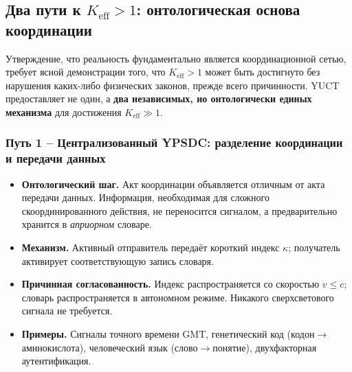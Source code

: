 \documentclass[11pt,a4paper]{article}
\begin{document}
	\subsection{Два пути к \(K_{\mathrm{eff}} > 1\): онтологическая основа координации}
	\label{subsec:two-paths-ontology}
	
	Утверждение, что реальность фундаментально является координационной сетью, требует
	ясной демонстрации того, что \(K_{\mathrm{eff}} > 1\) может быть достигнуто без
	нарушения каких-либо физических законов, прежде всего причинности. YUCT предоставляет не
	один, а \textbf{два независимых, но онтологически единых механизма} для достижения
	\(K_{\mathrm{eff}} \gg 1\).
	
	\subsubsection*{Путь 1 – Централизованный YPSDC: разделение координации и передачи данных}
	\begin{itemize}[leftmargin=*]
		\item \textbf{Онтологический шаг.} Акт координации объявляется
		отличным от акта передачи данных. Информация, необходимая для
		сложного скоординированного действия, не переносится сигналом, а предварительно хранится
		в \emph{априорном} словаре.
		\item \textbf{Механизм.} Активный отправитель передаёт короткий индекс
		\(\kappa\); получатель активирует соответствующую запись
		словаря.
		\item \textbf{Причинная согласованность.} Индекс распространяется со скоростью \(v \le c\);
		словарь распространяется в автономном режиме. Никакого сверхсветового сигнала не требуется.
		\item \textbf{Примеры.} Сигналы точного времени GMT, генетический код (кодон$\to$аминокислота), человеческий язык (слово$\to$понятие), двухфакторная аутентификация.
	\end{itemize}
	
\end{document}
